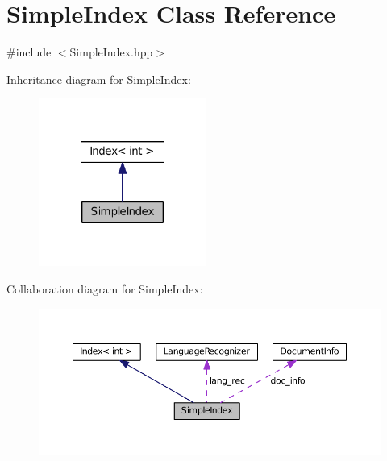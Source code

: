 \hypertarget{class_simple_index}{\section{Simple\-Index Class Reference}
\label{class_simple_index}
}


{\ttfamily \#include $<$Simple\-Index.\-hpp$>$}



Inheritance diagram for Simple\-Index\-:\nopagebreak
\begin{figure}[H]
\begin{center}
\leavevmode
\includegraphics[width=156pt]{class_simple_index__inherit__graph}
\end{center}
\end{figure}


Collaboration diagram for Simple\-Index\-:\nopagebreak
\begin{figure}[H]
\begin{center}
\leavevmode
\includegraphics[width=350pt]{class_simple_index__coll__graph}
\end{center}
\end{figure}
